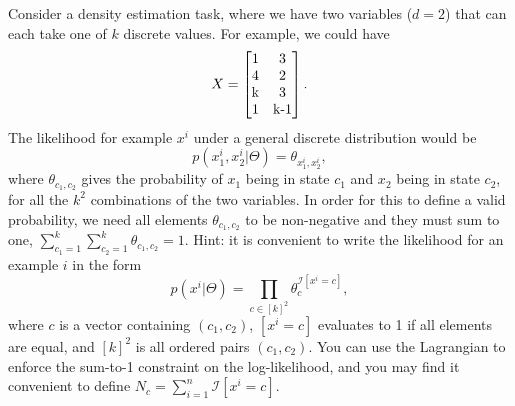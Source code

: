 \documentclass{article}
\begin{document}
Consider a density estimation task, where we have two variables ($d=2$) that can each take one of $k$ discrete values. For example, we could have
\[
X = \mat{1 & 3\\4 & 2\\ $k$ & 3\\1 & $k-1$}.
\]
The likelihood for example $x^i$ under a general discrete distribution would be
\[
p(x^i_1, x^i_2 | \Theta) = \theta_{x_1^i,x_2^i},
\]
where $\theta_{c_1,c_2}$ gives the probability of $x_1$ being in state $c_1$ and $x_2$ being in state $c_2$, for all the $k^2$ combinations of the two variables. In order for this to define a valid probability, we need all elements $\theta_{c_1,c_2}$ to be non-negative and they must sum to one, $\sum_{c_1=1}^k\sum_{c_2=1}^k \theta_{c_1,c_2} = 1$.
Hint: it is convenient to write the likelihood for an example $i$ in the form
\[
p(x^i | \Theta) = \prod_{c \in [k]^2}\theta_c^{\mathcal{I}[x^i = c]},
\]
where $c$ is a vector containing $(c_1,c_2)$, $[x^i = c]$ evaluates to 1 if all elements are equal, and $[k]^2$ is all ordered pairs $(c_1,c_2)$. You can use the Lagrangian to enforce the sum-to-1 constraint on the log-likelihood, and you may find it convenient to define $N_c = \sum_{i=1}^n \mathcal{I}[x^i = c]$.

\newpage
\end{document}
